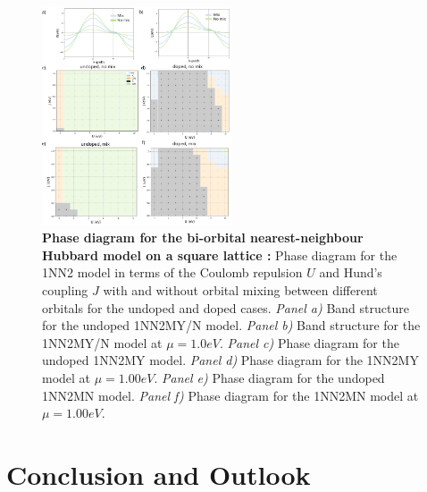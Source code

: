 \documentclass[11pt]{article}
\begin{document}
\begin{figure}[htbp]  %
    \centering
    \includegraphics[width=0.50\textwidth]{1NN2.png}  %
    \caption{\textbf{Phase diagram for the bi-orbital nearest-neighbour Hubbard model on a square lattice :} Phase diagram for the 1NN2 model in terms of 
    the Coulomb repulsion $U$ and Hund's coupling $J$ with and without orbital 
    mixing between different orbitals for the undoped and doped cases. \textit{Panel a)} Band structure for the undoped 1NN2MY/N model. 
    \textit{Panel b)} Band structure for the 1NN2MY/N model at $\mu =1.0eV$. 
    \textit{Panel c)} Phase diagram for the undoped 1NN2MY model.
    \textit{Panel d)} Phase diagram for the 1NN2MY model at $\mu =1.00eV$.
    \textit{Panel e)} Phase diagram for the undoped 1NN2MN model.
    \textit{Panel f)} Phase diagram for the 1NN2MN model at $\mu =1.00eV$.}
    \label{fig:1NN2pd}
\end{figure}
\section{Conclusion and Outlook}
\end{document}
